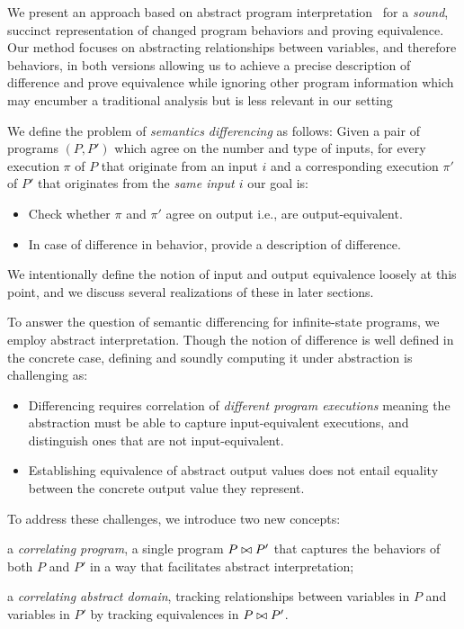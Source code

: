 We present an approach based on abstract program interpretation~\cite{CousotCousot77} for a \emph{sound}, succinct representation of changed program behaviors and proving equivalence. Our method focuses on abstracting relationships between variables, and therefore behaviors, in both versions allowing us to achieve a precise description of difference and prove equivalence while ignoring other program information which may encumber a traditional analysis but is less relevant in our setting

We define the problem of \emph{semantics differencing} as follows: Given a pair of programs $(P,P')$ which agree on the number and type of inputs, for every execution $\pi$ of $P$ that originate from an input $i$ and a corresponding execution $\pi'$ of $P'$ that originates from the \emph{same input $i$} our goal is:
\begin{itemize}
\item Check whether $\pi$ and $\pi'$ agree on output i.e., are output-equivalent.
\item In case of difference in behavior, provide a description of difference.
\end{itemize}
We intentionally define the notion of input and output equivalence loosely at this point, and we discuss several realizations of these in later sections.

To answer the question of semantic differencing for infinite-state programs, we employ abstract interpretation. Though the notion of difference is well defined in the concrete case, defining and soundly computing it under abstraction is challenging as:
\begin{itemize}
\item Differencing requires correlation of \emph{different program executions} meaning the abstraction must be able to capture input-equivalent executions, and distinguish ones that are not input-equivalent.
\item Establishing equivalence of abstract output values does not entail equality between the concrete output value they represent.
\end{itemize}

To address these challenges, we introduce two new concepts:
\begin{inparaenum}[(i)]
\item a \emph{correlating program}, a single program $P \bowtie P'$ that captures the behaviors of both $P$ and $P'$ in a way that facilitates abstract interpretation;
\item a \emph{correlating abstract domain}, tracking relationships between variables in $P$ and variables in $P'$ by tracking equivalences in $P \bowtie P'$.
\end{inparaenum}


